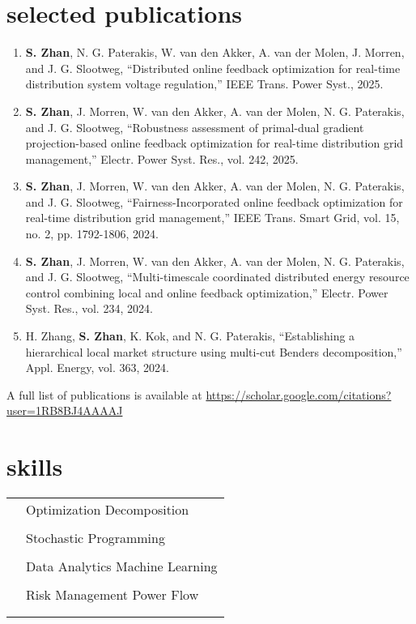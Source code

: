 \documentclass[12pt]{article}
\newcommand{\tableentry}[3]{\textsc{#1} & #2\expandafter\ifstrequal\expandafter{#3}{}{\\}{\\[6pt]}}
\begin{document}
\begin{paracol}{2}
\section{selected publications}
\begin{enumerate}
    \item \textbf{S. Zhan}, N. G. Paterakis, W. van den Akker, A. van der Molen, J. Morren, and J. G. Slootweg, “Distributed online feedback optimization for real-time distribution system voltage regulation,” IEEE Trans. Power Syst., 2025.
    \item \textbf{S. Zhan}, J. Morren, W. van den Akker, A. van der Molen, N. G. Paterakis, and J. G. Slootweg, “Robustness assessment of primal-dual gradient projection-based online feedback optimization for real-time distribution grid management,” Electr. Power Syst. Res., vol. 242,  2025.
    \item \textbf{S. Zhan}, J. Morren, W. van den Akker, A. van der Molen, N. G. Paterakis, and J. G. Slootweg, “Fairness-Incorporated online feedback optimization for real-time distribution grid management,” IEEE Trans. Smart Grid, vol. 15, no. 2, pp. 1792-1806, 2024.
      \item \textbf{S. Zhan}, J. Morren, W. van den Akker, A. van der Molen, N. G. Paterakis, and J. G. Slootweg, “Multi-timescale coordinated distributed energy resource control combining local and online feedback optimization,” Electr. Power Syst. Res., vol. 234, 2024.
      \item H. Zhang, \textbf{S. Zhan}, K. Kok, and N. G. Paterakis, “Establishing a hierarchical local market structure using multi-cut Benders decomposition,” Appl. Energy, vol. 363, 2024.
\end{enumerate}

\raggedright
A full list of publications is available at \href{https://scholar.google.com/citations?user=1RB8BJ4AAAAJ}{https://scholar.google.com/citations?user=1RB8BJ4AAAAJ} 

\switchcolumn

\section{skills}
\begin{supertabular}{rl}
    \tableentry{\footnotesize\faKeyboard}{Optimization \textperiodcentered{} Decomposition }{}
      \tableentry{}{ Stochastic Programming }{}
      \tableentry{}{Data Analytics \textperiodcentered{}  Machine Learning}{}
      \tableentry{}{ Risk Management \textperiodcentered{} Power Flow}{} 
        

\end{supertabular}
\end{paracol}
\end{document}
